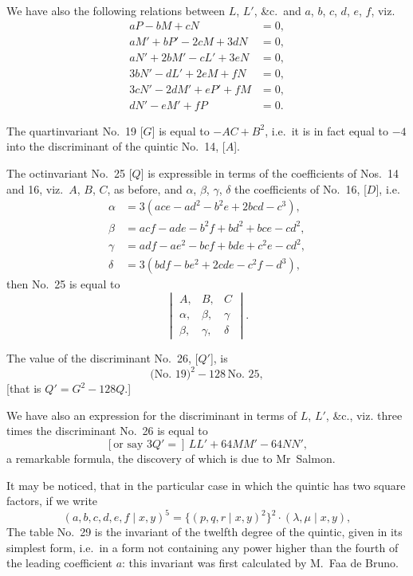 \documentclass[11pt,a4paper]{article}
\begin{document}
\clearpage
We have also the following relations between $L$, $L'$, \&c.\ and $a$, $b$, $c$, $d$, $e$, $f$,
viz.
\begin{align*}
aP - bM + cN &= 0,\\
aM' + bP' - 2cM + 3dN &= 0,\\
aN' + 2bM' - cL' + 3eN &= 0,\\
3bN' - dL' + 2eM + fN &= 0,\\
3cN' - 2dM' + eP' + fM &= 0,\\
dN' - eM' + fP &= 0.
\end{align*}

The quartinvariant No.~19 [$G$] is equal to $-AC + B^2$,
i.e.\ it is in fact equal to $-4$ into the discriminant of the quintic No.~14, [$A$].

The octinvariant No.~25 [$Q$] is expressible in terms of the coefficients of Nos.~14 and 16,
viz.\ $A$, $B$, $C$, as before, and $\alpha$, $\beta$, $\gamma$, $\delta$ the coefficients of No.~16, [$D$],
i.e.
\begin{align*}
\alpha &= 3(ace - ad^2 - b^2e + 2bcd - c^3),\\
\beta &= acf - ade - b^2f + bd^2 + bce - cd^2,\\
\gamma &= adf - ae^2 - bcf + bde + c^2e - cd^2,\\
\delta &= 3(bdf - be^2 + 2cde - c^2f - d^3),
\end{align*}
then No.~25 is equal to
\[
\begin{vmatrix}
A, & B, & C \\
\alpha, & \beta, & \gamma \\
\beta, & \gamma, & \delta
\end{vmatrix}
.\]

The value of the discriminant No.~26, [$Q'$], is
\[\text{(No.~19)}^2 - 128\,\text{No.~25},\]
[that is $Q' = G^2 - 128Q$.]

We have also an expression for the discriminant in terms of $L$, $L'$, \&c., viz.
three times the discriminant No.~26 is equal to
\[[\text{or say }3Q' =]\, LL' + 64MM' - 64NN',\]
a remarkable formula, the discovery of which is due to Mr~Salmon.

It may be noticed, that in the particular case in which the quintic has two square
factors, if we write
\[(a, b, c, d, e, f \mid x, y)^5 = \{(p, q, r \mid x, y)^2\}^2 \cdot (\lambda, \mu \mid x, y),\]
\clearpage
The table No.~29 is the invariant of the twelfth degree of the quintic,
given in its simplest form, i.e.\ in a form not containing any power higher than
the fourth of the leading coefficient $a$: this invariant was first calculated by M.~Faa de Bruno.
\end{document}
